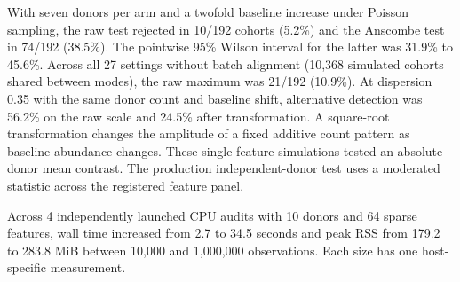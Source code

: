 With seven donors per arm and a twofold baseline increase under Poisson sampling, the raw test rejected in 10/192 cohorts (5.2\%) and the Anscombe test in 74/192 (38.5\%). The pointwise 95\% Wilson interval for the latter was 31.9\% to 45.6\%. Across all 27 settings without batch alignment (10,368 simulated cohorts shared between modes), the raw maximum was 21/192 (10.9\%). At dispersion 0.35 with the same donor count and baseline shift, alternative detection was 56.2\% on the raw scale and 24.5\% after transformation. A square-root transformation changes the amplitude of a fixed additive count pattern as baseline abundance changes. These single-feature simulations tested an absolute donor mean contrast. The production independent-donor test uses a moderated statistic across the registered feature panel.

Across 4 independently launched CPU audits with 10 donors and 64 sparse features, wall time increased from 2.7 to 34.5 seconds and peak RSS from 179.2 to 283.8 MiB between 10,000 and 1,000,000 observations. Each size has one host-specific measurement.
